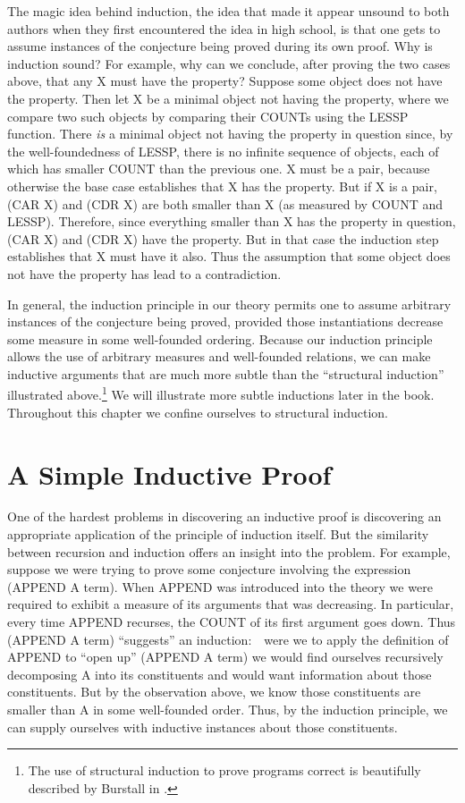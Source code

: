 \documentclass[11pt]{book}
\newcommand{\pubinlineunderline}[1]{\emph{#1}}
\newcommand{\pubdefaulttextsize}{\large}
\begin{document}
The magic idea behind induction, the idea that made it appear
unsound to both authors when they first encountered the idea
in high school, is that one gets to assume instances of
the conjecture being proved during its own proof.
Why is induction sound?
For example, why can we conclude, after proving the two cases above, that any
X must have the property?  Suppose some object does not have the property.
Then let X be a minimal object not having the property, where we
compare two such objects by comparing their COUNTs using the
LESSP function.
There \pubinlineunderline{is} a minimal object not having the property in question since,
by the well-foundedness of LESSP, there is no infinite sequence
of objects, each of which has smaller COUNT than the previous one.
X must be a pair, because otherwise the base case
establishes that X has the property.  But if X is a pair,
(CAR X) and (CDR X) are both smaller than X (as measured by
COUNT and LESSP).  Therefore, since everything smaller than X has
the property in question, (CAR X) and (CDR X) have the
property.  But in that case the induction step establishes that X must have it
also.  Thus the assumption that some object does not have the property
has lead to a contradiction.

In general, the induction principle in our theory permits one to assume
arbitrary instances of the conjecture being proved, provided those
instantiations decrease some measure in some well-founded
ordering.  Because our induction principle allows the use of arbitrary measures
and well-founded relations, we can make
inductive arguments that are much more subtle than the ``structural induction''
illustrated above.\footnote{The use of structural induction to prove programs correct is beautifully described by Burstall in \cite{BURSTALL}.}
We will illustrate more subtle inductions later in the book.
Throughout this chapter we confine ourselves to structural induction.
\section{A Simple Inductive Proof}
\pubdefaulttextsize
One of the hardest problems in discovering an inductive proof
is discovering an appropriate application of the principle of induction itself.  But the
similarity between recursion and induction offers an insight into
the problem.  For example, suppose we were trying to prove
some conjecture involving the expression (APPEND A term).
When APPEND was introduced
into the theory we were required to exhibit a measure of its
arguments that was decreasing.  In particular, every time APPEND
recurses, the COUNT of its first argument goes down.
Thus   (APPEND A term)  ``suggests'' an induction:~~were we to
apply the definition of APPEND to ``open up''
(APPEND A term) we would find ourselves recursively decomposing A into its
constituents and would want information about those constituents.
But by the observation above, we know those constituents
are smaller than A in some well-founded order.  Thus, by the induction
principle, we can supply ourselves with inductive instances about those
constituents.
\end{document}
